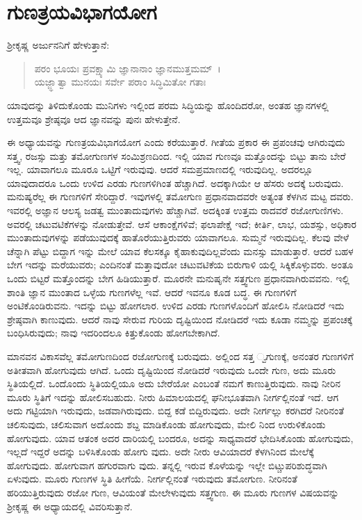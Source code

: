 
\chapter{ಗುಣತ್ರಯವಿಭಾಗಯೋಗ}

ಶ‍್ರೀಕೃಷ್ಣ ಅರ್ಜುನನಿಗೆ ಹೇಳುತ್ತಾನೆ:

\begin{verse}
ಪರಂ ಭೂಯಃ ಪ್ರವಕ್ಷ್ಯಾಮಿ ಜ್ಞಾನಾನಾಂ ಜ್ಞಾನಮುತ್ತಮಮ್~।\\ಯಜ್ಜ್ಞಾತ್ವಾ ಮುನಯಃ ಸರ್ವೇ ಪರಾಂ ಸಿದ್ಧಿಮಿತೋ ಗತಾಃ 
\end{verse}

{\small ಯಾವುದನ್ನು ತಿಳಿದುಕೊಂಡು ಮುನಿಗಳು ಇಲ್ಲಿಂದ ಪರಮ ಸಿದ್ಧಿಯನ್ನು ಹೊಂದಿದರೋ, ಅಂತಹ ಜ್ಞಾನಗಳಲ್ಲಿ ಉತ್ತಮವೂ ಶ್ರೇಷ್ಠವೂ ಆದ ಜ್ಞಾನವನ್ನು ಪುನಃ ಹೇಳುತ್ತೇನೆ.}

ಈ ಅಧ್ಯಾಯವನ್ನು ಗುಣತ್ರಯವಿಭಾಗಯೋಗ ಎಂದು ಕರೆಯುತ್ತಾರೆ. ಗೀತೆಯ ಪ್ರಕಾರ ಈ ಪ್ರಪಂಚವು ಆಗಿರುವುದು ಸತ್ತ್ವ, ರಜಸ್ಸು ಮತ್ತು ತಮೋಗುಣಗಳ ಸಂಮಿಶ್ರಣದಿಂದ. ಇಲ್ಲಿ ಯಾವ ಗುಣವೂ ಮತ್ತೊಂದನ್ನು ಬಿಟ್ಟು ತಾನು ಬೇರೆ ಇಲ್ಲ. ಯಾವಾಗಲೂ ಮೂರೂ ಒಟ್ಟಿಗೆ ಇರುವುವು. ಆದರೆ ಸಮಪ್ರಮಾಣದಲ್ಲಿ ಇರುವುದಿಲ್ಲ. ಅದರಲ್ಲೂ ಯಾವುದಾದರೂ ಒಂದು ಉಳಿದ ಎರಡು ಗುಣಗಳಿಗಿಂತ ಹೆಚ್ಚಾಗಿದೆ. ಅದಕ್ಕಾಗಿಯೇ ಆ ಹೆಸರು ಅದಕ್ಕೆ ಬರುವುದು. ಮನುಷ್ಯರೆಲ್ಲ ಈ ಗುಣಗಳಿಗೆ ಸೇರಿದ್ದಾರೆ. ಇವುಗಳಲ್ಲಿ ತಮೋಗುಣ ಪ್ರಧಾನವಾದವರೇ ಅತ್ಯಂತ ಕೆಳಗಿನ ಮಟ್ಟ ದವರು. ಇವರಲ್ಲಿ ಅಜ್ಞಾನ ಆಲಸ್ಯ ಜಡತ್ವ ಮುಂತಾದುವುಗಳು ಹೆಚ್ಚಾಗಿವೆ. ಅದಕ್ಕಿಂತ ಉತ್ತಮ ರಾದವರೆ ರಜೋಗುಣಿಗಳು. ಅವರಲ್ಲಿ ಚಟುವಟಿಕೆಗಳನ್ನು ನೋಡುತ್ತೇವೆ. ಆಸೆ ಆಕಾಂಕ್ಷೆಗಳಿವೆ; ಫಲಾಪೇಕ್ಷೆ ಇದೆ; ಕೀರ್ತಿ, ಲಾಭ, ಯಶಸ್ಸು, ಅಧಿಕಾರ ಮುಂತಾದುವುಗಳನ್ನು ಪಡೆಯುವುದಕ್ಕೆ ಹಾತೊರೆಯುತ್ತಿರುವರು ಯಾವಾಗಲೂ. ಸುಮ್ಮನೆ ಇರುವುದಿಲ್ಲ. ಕೆಲವು ವೇಳೆ ಚೆನ್ನಾಗಿ ಪೆಟ್ಟು ಬಿದ್ದಾಗ ಇನ್ನು ಮೇಲೆ ಯಾವ ಕೆಲಸಕ್ಕೂ ಕೈಹಾಕುವುದಿಲ್ಲವೆಂದು ಮನಸ್ಸು ಮಾಡುತ್ತಾರೆ. ಆದರೆ ಬಹಳ ಬೇಗ ಇದನ್ನು ಮರೆಯುವರು; ಎಂದಿನಂತೆ ಮತ್ತಾವುದೋ ಚಟುವಟಿಕೆಯ ಬಿರುಗಾಳಿ ಯಲ್ಲಿ ಸಿಕ್ಕಿಕೊಳ್ಳುವರು. ಅಂತೂ ಒಂದು ಬಿಟ್ಟರೆ ಮತ್ತೊಂದನ್ನು ಬೇಗ ಹಿಡಿಯುತ್ತಾರೆ. ಮೂರನೇ ಮನುಷೃನೇ ಸತ್ತ್ವಗುಣ ಪ್ರಧಾನವಾಗಿರುವವನು. ಇಲ್ಲಿ ಶಾಂತಿ ಜ್ಞಾನ ಮುಂತಾದ ಒಳ್ಳೆಯ ಗುಣಗಳೆಲ್ಲ ಇವೆ. ಆದರೆ ಇವನೂ ಕೂಡ ಬದ್ಧ. ಈ ಗುಣಗಳಿಗೆ ಅಂಟಿಕೊಂಡಿರುವನು. ಇದನ್ನು ಬಿಟ್ಟು ಹೋಗಲಾರ. ಉಳಿದ ಎರಡು ಗುಣಗಳೊಂದಿಗೆ ಹೋಲಿಸಿ ನೋಡಿದರೆ ಇದು ಶ್ರೇಷ್ಠವಾಗಿ ಕಾಣುವುದು. ಆದರೆ ನಾವು ಸೇರುವ ಗುರಿಯ ದೃಷ್ಟಿಯಿಂದ ನೋಡಿದರೆ ಇದು ಕೂಡಾ ನಮ್ಮನ್ನು ಪ್ರಪಂಚಕ್ಕೆ ಬಂಧಿಸಿರುವುದು; ನಾವು ಇದರಿಂದಲೂ ಕಿತ್ತುಕೊಂಡು ಹೋಗಬೇಕಾಗಿದೆ.

ಮಾನವನ ವಿಕಾಸವೆಲ್ಲ ತಮೋಗುಣದಿಂದ ರಜೋಗುಣಕ್ಕೆ ಬರುವುದು. ಅಲ್ಲಿಂದ ಸತ್ತ ್ವಗುಣಕ್ಕೆ, ಅನಂತರ ಗುಣಗಳಿಗೆ ಅತೀತವಾಗಿ ಹೋಗುವುದು ಆಗಿದೆ. ಒಂದು ದೃಷ್ಟಿಯಿಂದ ನೋಡಿದರೆ ಇರುವುದು ಒಂದೇ ಗುಣ, ಅದು ಮೂರು ಸ್ಥಿತಿಯಲ್ಲಿದೆ. ಒಂದೊಂದು ಸ್ಥಿತಿಯಲ್ಲಿಯೂ ಅದು ಬೇರೆಯೋ ಎಂಬಂತೆ ನಮಗೆ ಕಾಣುತ್ತಿರುವುದು. ನಾವು ನೀರಿನ ಮೂರು ಸ್ಥಿತಿಗೆ ಇದನ್ನು ಹೋಲಿಸಬಹುದು. ನೀರು ಹಿಮಾಲಯದಲ್ಲಿ ಘನೀಭೂತವಾಗಿ ನೀರ್ಗಲ್ಲಿನಂತೆ ಇದೆ. ಆಗ ಅದು ಗಟ್ಟಿಯಾಗಿ ಇರುವುದು, ಜಡವಾಗಿರುವುದು. ಬಿದ್ದ ಕಡೆ ಬಿದ್ದಿರುವುದು. ಅದೇ ನೀರ್ಗಲ್ಲು ಕರಗಿದರೆ ನೀರಿನಂತೆ ಚಲಿಸುವುದು, ಚಲಿಸುವಾಗ ಅದೊಂದು ಶಬ್ದ ಮಾಡಿಕೊಂಡು ಹೋಗುವುದು, ಮೇಲಿ ನಿಂದ ಉರುಳಿಕೊಂಡು ಹೋಗುವುದು. ಯಾವ ಆತಂಕ ಅದರ ದಾರಿಯಲ್ಲಿ ಬಂದರೂ, ಅದನ್ನು ಸಾಧ್ಯವಾದರೆ ಭೇದಿಸಿಕೊಂಡು ಹೋಗುವುದು, ಇಲ್ಲದೆ ಇದ್ದರೆ ಅದನ್ನು ಬಳಿಸಿಕೊಂಡು ಹೋಗು ವುದು. ಅದೇ ನೀರು ಆವಿಯಾದರೆ ಕೆಳಗಿನಿಂದ ಮೇಲೆಕ್ಕೆ ಹೋಗುವುದು. ಹೋಗುವಾಗ ಹಗುರವಾಗು ವುದು. ತನ್ನಲ್ಲಿ ಇರುವ ಕೊಳೆಯನ್ನು ಇಲ್ಲೇ ಬಿಟ್ಚುಪರಿಶುದ್ಧವಾಗಿ ಏಳುವುದು. ಮೂರು ಗುಣಗಳ ಸ್ಥಿತಿ ಹೀಗೆಯೆ. ನೀರ್ಗಲ್ಲಿನಂತೆ ಇರುವುದು ತಮೋಗುಣ. ನೀರಿನಂತೆ ಹರಿಯುತ್ತಿರುವುದು ರಜೋ ಗುಣ, ಆವಿಯಂತೆ ಮೇಲೇಳುವುದು ಸತ್ತ್ವಗುಣ. ಈ ಮೂರು ಗುಣಗಳ ವಿಷಯವನ್ನು ಶ‍್ರೀಕೃಷ್ಣ ಈ ಅಧ್ಯಾಯದಲ್ಲಿ ವಿವರಿಸುತ್ತಾನೆ.

